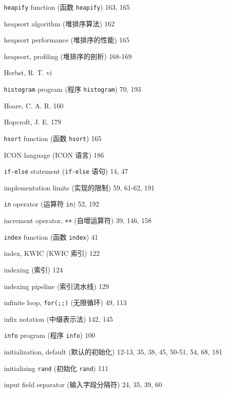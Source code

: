 \begin{multicols}{2}
\hangindent=2pc  \verb'heapify' function (函数 \verb'heapify') 163, 165

\hangindent=2pc  heapsort algorithm (堆排序算法) 162

\hangindent=2pc  heapsort performance (堆排序的性能) 165

\hangindent=2pc  heapsort, profiling (堆排序的剖析) 168-169

\hangindent=2pc  Herbst, R. T. vi

\hangindent=2pc  \verb'histogram' program (程序
\verb'histogram') 70, 193

\hangindent=2pc  Hoare, C. A. R. 160

\hangindent=2pc  Hopcroft, J. E. 179

\hangindent=2pc  \verb'hsort' function (函数 \verb'hsort') 165

\hangindent=2pc  ICON language (ICON 语言) 186

\hangindent=2pc  \verb'if-else' statement (\verb'if-else' 语句) 14, 47

\hangindent=2pc  implementation limits (实现的限制) 59, 61-62, 191

\hangindent=2pc  \verb'in' operator (运算符 \verb'in') 52, 192

\hangindent=2pc  increment operator, \verb'++' (自增运算符) 39, 146, 158

\hangindent=2pc  \verb'index' function (函数 \verb'index') 41

\hangindent=2pc  index, KWIC (KWIC 索引) 122

\hangindent=2pc  indexing (索引) 124

\hangindent=2pc  indexing pipeline (索引流水线) 129

\hangindent=2pc  infinite loop, \verb'for(;;)' (无限循环) 49, 113

\hangindent=2pc  infix notation (中缀表示法) 142, 145

\hangindent=2pc  \verb'info' program (程序 \verb'info') 100

\hangindent=2pc  initialization, default (默认的初始化)
12-13, 35, 38, 45, 50-51, 54, 68, 181

\hangindent=2pc  initializing \verb'rand' (初始化 \verb'rand') 111

\hangindent=2pc  input field separator (输入字段分隔符) 24, 35, 39, 60


\end{multicols}
